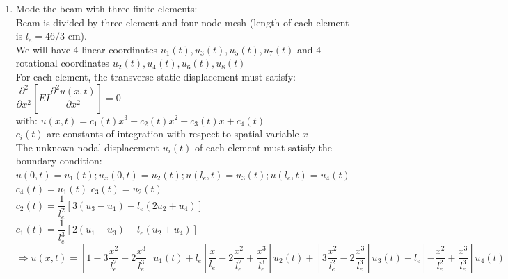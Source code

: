 \documentclass[14pt,a4paper]{article}
\begin{document}
\begin{enumerate}
	\item Mode the beam with three finite elements:\\
	Beam is divided by three element and four-node mesh (length of each element is $l_e = 46/3$ cm). \\
	We will have 4 linear coordinates $u_1(t), u_3(t), u_5(t), u_7(t)$ and 4 rotational coordinates $u_2(t), u_4(t), u_6(t), u_8(t)$\\
	For each element, the transverse static displacement must satisfy: $\dfrac{\partial^2}{\partial x^2}\left[ EI\dfrac{\partial^2u(x,t)}{\partial x^2}\right] = 0$\\
	with: $u(x,t) = c_1(t)x^3 + c_2(t)x^2 + c_3(t)x + c_4(t)$\\
	\hspace{1cm} $c_i(t)$ are constants of integration with respect to spatial variable $x$\\
	The unknown nodal displacement $u_i(t)$ of each element must satisfy the boundary condition:\\
	$u(0,t) = u_1(t); u_x(0,t) = u_2(t); u(l_e,t) = u_3(t); u(l_e,t) = u_4(t)$\\
	\hspace*{2cm} $c_4(t) = u_1(t)$ \hspace{1cm} $c_3(t) = u_2(t)$\\
	\hspace*{2cm} $c_2(t) = \dfrac{1}{l_e^2}[3(u_3 -u_1) - l_e(2u_2 + u_4)]$\\
	\hspace*{2cm} $c_1(t) = \dfrac{1}{l_e^3}[2(u_1 -u_3) - l_e(u_2 + u_4)]$\\
	$\Rightarrow u(x,t) = \left[ 1 - 3\dfrac{x^2}{l_e^2} + 2\dfrac{x^3}{l_e^3} \right]u_1(t) + l_e\left[ \dfrac{x}{l_e} - 2\dfrac{x^2}{l_e^2} + \dfrac{x^3}{l_e^3}\right] u_2(t) + \left[ 3\dfrac{x^2}{l_e^2} -2\dfrac{x^3}{l_e^3}\right] u_3(t) + l_e\left[ -\dfrac{x^2}{l_e^2} + \dfrac{x^3}{l_e^3}\right] u_4(t)$\\
	

\end{enumerate}
\end{document}
